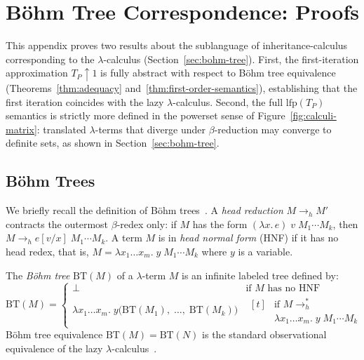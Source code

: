 \section{B\"ohm Tree Correspondence: Proofs}
\label{app:bohm-tree-proofs}

This appendix proves two results about the sublanguage of
inheritance-calculus corresponding to the $\lambda$-calculus
(Section~\ref{sec:bohm-tree}).
First, the first-iteration approximation
$T_P\!\uparrow\!1$ is fully abstract with respect to
B\"ohm tree equivalence
(Theorems~\ref{thm:adequacy} and~\ref{thm:first-order-semantics}),
establishing that the first iteration coincides with
the lazy $\lambda$-calculus.
Second, the full $\mathrm{lfp}(T_P)$ semantics is strictly
more defined in the powerset sense of
Figure~\ref{fig:calculi-matrix}: translated $\lambda$-terms
that diverge under $\beta$-reduction may converge to definite
sets, as shown in Section~\ref{sec:bohm-tree}.

\subsection{B\"ohm Trees}

We briefly recall the definition of B\"ohm
trees~\cite{barendregt1984-lambda-calculus}.
A \emph{head reduction} $M \to_h M'$ contracts
the outermost $\beta$-redex only: if $M$ has the form
$(\lambda x.\, e)\; v\; M_1 \cdots M_k$, then
$M \to_h e[v/x]\; M_1 \cdots M_k$.
A term $M$ is in \emph{head normal form} (HNF) if it has no
head redex, that is, $M = \lambda x_1 \ldots x_m.\;
y\; M_1 \cdots M_k$ where $y$ is a variable.

The \emph{B\"ohm tree} $\mathrm{BT}(M)$ of a $\lambda$-term $M$
is an infinite labeled tree defined by:
\[
  \mathrm{BT}(M) =
  \begin{cases}
    \bot & \text{if } M \text{ has no HNF} \\[6pt]
    \lambda x_1 \ldots x_m.\;
    y\bigl(\mathrm{BT}(M_1),\; \ldots,\; \mathrm{BT}(M_k)\bigr)
    &
    \begin{aligned}[t]
      &\text{if } M \to^*_h \\[-2pt]
      &\lambda x_1 \ldots x_m.\; y\; M_1 \cdots M_k
    \end{aligned}
  \end{cases}
\]
B\"ohm tree equivalence $\mathrm{BT}(M) = \mathrm{BT}(N)$ is the
standard observational equivalence of the lazy
$\lambda$-calculus~\cite{abramsky1993-full-abstraction-lazy-lambda,abramsky1995-games-full-abstraction-lazy-lambda}.

